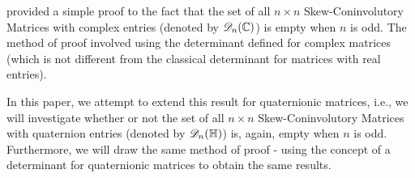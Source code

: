 \cite{stamaria} provided a simple proof to the fact that the set of all $n \times n$ Skew-Coninvolutory Matrices with complex entries (denoted by $\mathscr{D}_n(\operatorname{\mathbb{C}})$) is empty when $n$ is odd. The method of proof involved using the determinant defined for complex matrices (which is not different from the classical determinant for matrices with real entries).

In this paper, we attempt to extend this result for quaternionic matrices, i.e., we will investigate whether or not the set of all $n \times n$ Skew-Coninvolutory Matrices with quaternion entries (denoted by $\mathscr{D}_n(\operatorname{\mathbb{H}})$) is, again, empty when $n$ is odd. Furthermore, we will draw the same method of proof - using the concept of a determinant for quaternionic matrices to obtain the same results.